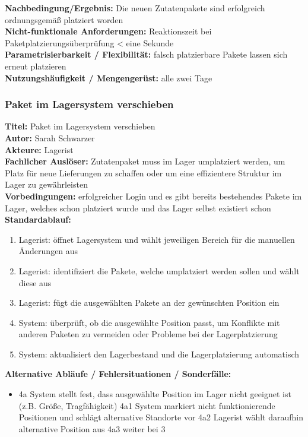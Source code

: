 \textbf{Nachbedingung/Ergebnis:}  Die neuen Zutatenpakete sind erfolgreich ordnungsgemäß platziert worden\\
\textbf{Nicht-funktionale Anforderungen:} Reaktionszeit bei Paketplatzierungsüberprüfung < eine Sekunde\\
\textbf{Parametrisierbarkeit / Flexibilität:} falsch platzierbare Pakete lassen sich erneut platzieren\\
\textbf{Nutzungshäufigkeit / Mengengerüst:} alle zwei Tage\\

\subsubsection{Paket im Lagersystem verschieben}
\textbf{Titel:} Paket im Lagersystem verschieben\\
\textbf{Autor:} Sarah Schwarzer\\
\textbf{Akteure:} Lagerist\\
\textbf{Fachlicher Auslöser:} Zutatenpaket muss im Lager umplatziert werden, um Platz für neue Lieferungen zu schaffen oder um eine effizientere Struktur im Lager zu gewährleisten\\
\textbf{Vorbedingungen:} erfolgreicher Login und es gibt bereits bestehendes Pakete im Lager, welches schon platziert wurde und das Lager selbst existiert schon\\
\textbf{Standardablauf:}
\begin{enumerate}
    \item Lagerist: öffnet Lagersystem und wählt jeweiligen Bereich für die manuellen Änderungen aus\\
    \item Lagerist: identifiziert die Pakete, welche umplatziert werden sollen und wählt diese aus\\
    \item Lagerist: fügt die ausgewählten Pakete an der gewünschten Position ein\\
    \item System: überprüft, ob die ausgewählte Position passt, um Konflikte mit anderen Paketen zu vermeiden oder Probleme bei der Lagerplatzierung \\
    \item System: aktualisiert den Lagerbestand und die Lagerplatzierung automatisch\\
\end{enumerate}
\textbf{Alternative Abläufe / Fehlersituationen / Sonderfälle:}
\begin{itemize}
	\item 4a System stellt fest, dass ausgewählte Position im Lager nicht geeignet ist (z.B. Größe, Tragfähigkeit)
		\subitem 4a1 System markiert nicht funktionierende Positionen und schlägt alternative Standorte vor
		\subitem 4a2 Lagerist wählt daraufhin alternative Position aus
		\subitem 4a3 weiter bei 3\\
\end{itemize}

